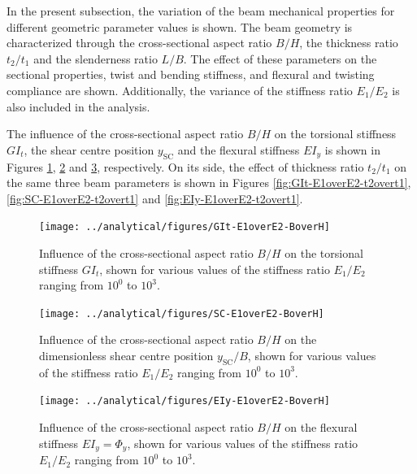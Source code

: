     In the present subsection, the variation of the beam mechanical properties for different geometric parameter values is shown. The beam geometry is characterized through the cross-sectional aspect ratio $B/H$, the thickness ratio $t_2/t_1$ and the slenderness ratio $L/B$. The effect of these parameters on the sectional properties, twist and bending stiffness, and flexural and twisting compliance are shown. Additionally, the variance of the stiffness ratio $E_1/E_2$ is also included in the analysis.

    The influence of the cross-sectional aspect ratio $B/H$ on the torsional stiffness $G I_t$, the shear centre position $y_{\mathrm{SC}}$ and the flexural stiffness $E I_y$ is shown in Figures \ref{fig:GIt-E1overE2-BoverH}, \ref{fig:SC-E1overE2-BoverH} and \ref{fig:EIy-E1overE2-BoverH}, respectively. On its side, the effect of thickness ratio $t_2/t_1$ on the same three beam parameters is shown in Figures \ref{fig:GIt-E1overE2-t2overt1}, \ref{fig:SC-E1overE2-t2overt1} and \ref{fig:EIy-E1overE2-t2overt1}.

    \begin{figure}[!htpb] %
      \centering
      \texttt{[image: ../analytical/figures/GIt-E1overE2-BoverH]}
      \caption[Influence of the cross-sectional aspect ratio $B/H$ on the torsional stiffness $GI_t$]{Influence of the cross-sectional aspect ratio $B/H$ on the torsional stiffness $GI_t$, shown for various values of the stiffness ratio $E_1/E_2$ ranging from $10^0$ to $10^3$. }\label{fig:GIt-E1overE2-BoverH}
    \end{figure}

    \begin{figure}[!htpb] %
      \centering
      \texttt{[image: ../analytical/figures/SC-E1overE2-BoverH]}
      \caption[Influence of the cross-sectional aspect ratio $B/H$ on the dimensionless shear centre position $y_{\mathrm{SC}}/B$]{Influence of the cross-sectional aspect ratio $B/H$ on the dimensionless shear centre position $y_{\mathrm{SC}}/B$, shown for various values of the stiffness ratio $E_1/E_2$ ranging from $10^0$ to $10^3$. }\label{fig:SC-E1overE2-BoverH}
    \end{figure}

    \begin{figure}[!htpb] %
      \centering
      \texttt{[image: ../analytical/figures/EIy-E1overE2-BoverH]}
      \caption[Influence of the cross-sectional aspect ratio $B/H$ on the flexural stiffness $EI_y$]{Influence of the cross-sectional aspect ratio $B/H$ on the flexural stiffness $EI_y = \Phi_y$, shown for various values of the stiffness ratio $E_1/E_2$ ranging from $10^0$ to $10^3$. }\label{fig:EIy-E1overE2-BoverH}
    \end{figure}

